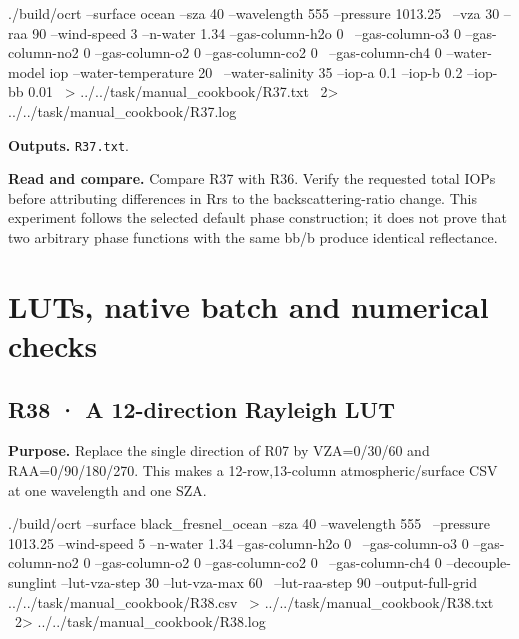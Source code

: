 \noindent\begin{minipage}{\linewidth}
\begin{ManualCode}

./build/ocrt --surface ocean --sza 40 --wavelength 555 --pressure 1013.25 \
  --vza 30 --raa 90 --wind-speed 3 --n-water 1.34 --gas-column-h2o 0 \
  --gas-column-o3 0 --gas-column-no2 0 --gas-column-o2 0 --gas-column-co2 0 \
  --gas-column-ch4 0 --water-model iop --water-temperature 20 \
  --water-salinity 35 --iop-a 0.1 --iop-b 0.2 --iop-bb 0.01 \
  > ../../task/manual_cookbook/R37.txt \
  2> ../../task/manual_cookbook/R37.log

\end{ManualCode}
\end{minipage}\par

\textbf{Outputs. }\texttt{R37.txt}.

\textbf{Read and compare. }Compare R37 with R36. Verify the requested total IOPs before attributing differences in Rrs to the backscattering-ratio change. This experiment follows the selected default phase construction; it does not prove that two arbitrary phase functions with the same bb/b produce identical reflectance.

\section{LUTs, native batch and numerical checks}
\label{sec:auto:09_cookbook:7}

\Needspace{17\baselineskip}

\subsection{R38 · A 12-direction Rayleigh LUT}
\label{sec:auto:09_cookbook:7.1}

\label{recipe:R38}

\textbf{Purpose. }Replace the single direction of R07 by VZA=0/30/60\textdegree{} and RAA=0/90/180/270\textdegree{}. This makes a 12-row,13-column atmospheric/surface CSV at one wavelength and one SZA.

\noindent\begin{minipage}{\linewidth}
\begin{ManualCode}

./build/ocrt --surface black_fresnel_ocean --sza 40 --wavelength 555 \
  --pressure 1013.25 --wind-speed 5 --n-water 1.34 --gas-column-h2o 0 \
  --gas-column-o3 0 --gas-column-no2 0 --gas-column-o2 0 --gas-column-co2 0 \
  --gas-column-ch4 0 --decouple-sunglint --lut-vza-step 30 --lut-vza-max 60 \
  --lut-raa-step 90 --output-full-grid ../../task/manual_cookbook/R38.csv \
  > ../../task/manual_cookbook/R38.txt \
  2> ../../task/manual_cookbook/R38.log

\end{ManualCode}
\end{minipage}\par

